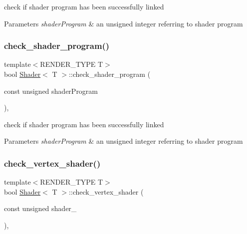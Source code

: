 check if shader program has been successfully linked 


\begin{DoxyParams}{Parameters}
{\em shader\+Program} & an unsigned integer referring to shader program \\
\hline
\end{DoxyParams}
\mbox{\label{classShader_aed672a8004b14078f149603eeb1a3f5a}} 
\subsubsection{\texorpdfstring{check\+\_\+shader\+\_\+program()}{check\_shader\_program()}\hspace{0.1cm}{\footnotesize\ttfamily [2/2]}}
{\footnotesize\ttfamily template$<$R\+E\+N\+D\+E\+R\+\_\+\+T\+Y\+PE T$>$ \\
bool \mbox{\hyperlink{classShader}{Shader}}$<$ T $>$\+::check\+\_\+shader\+\_\+program (\begin{DoxyParamCaption}\item[{const unsigned}]{shader\+Program }\end{DoxyParamCaption})\hspace{0.3cm}{\ttfamily [inline]}, {\ttfamily [protected]}}



check if shader program has been successfully linked 


\begin{DoxyParams}{Parameters}
{\em shader\+Program} & an unsigned integer referring to shader program \\
\hline
\end{DoxyParams}
\mbox{\label{classShader_a6be59304dbddc46ae641e6fe6cd02938}} 
\subsubsection{\texorpdfstring{check\+\_\+vertex\+\_\+shader()}{check\_vertex\_shader()}\hspace{0.1cm}{\footnotesize\ttfamily [1/2]}}
{\footnotesize\ttfamily template$<$R\+E\+N\+D\+E\+R\+\_\+\+T\+Y\+PE T$>$ \\
bool \mbox{\hyperlink{classShader}{Shader}}$<$ T $>$\+::check\+\_\+vertex\+\_\+shader (\begin{DoxyParamCaption}\item[{const unsigned}]{shader\+\_\+ }\end{DoxyParamCaption})\hspace{0.3cm}{\ttfamily [inline]}, {\ttfamily [protected]}}



